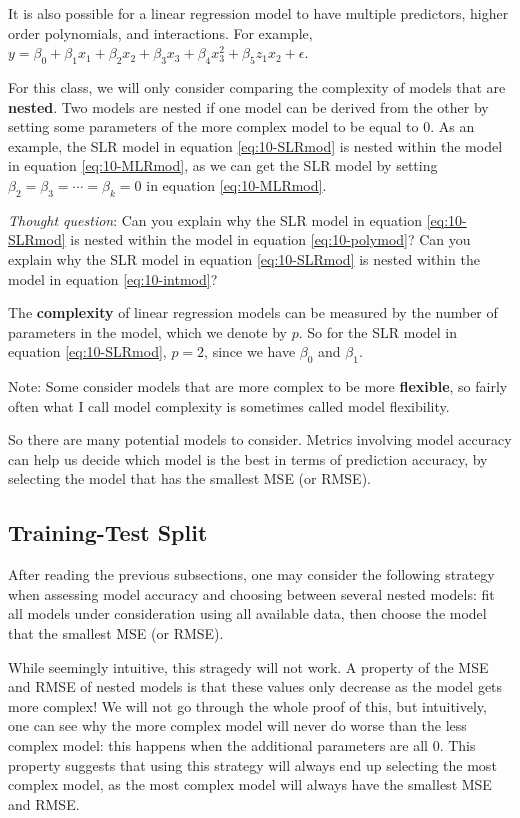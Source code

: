 \documentclass[
]{book}
\begin{document}
It is also possible for a linear regression model to have multiple predictors, higher order polynomials, and interactions. For example, \(y=\beta_0+\beta_{1}x_1 + \beta_2 x_2 + \beta_3 x_3 + \beta_4 x_3^2 + \beta_5 z_1 x_2 + \epsilon\).

For this class, we will only consider comparing the complexity of models that are \textbf{nested}. Two models are nested if one model can be derived from the other by setting some parameters of the more complex model to be equal to 0. As an example, the SLR model in equation \eqref{eq:10-SLRmod} is nested within the model in equation \eqref{eq:10-MLRmod}, as we can get the SLR model by setting \(\beta_2 = \beta_3 = \cdots = \beta_k = 0\) in equation \eqref{eq:10-MLRmod}.

\emph{Thought question}: Can you explain why the SLR model in equation \eqref{eq:10-SLRmod} is nested within the model in equation \eqref{eq:10-polymod}? Can you explain why the SLR model in equation \eqref{eq:10-SLRmod} is nested within the model in equation \eqref{eq:10-intmod}?

The \textbf{complexity} of linear regression models can be measured by the number of parameters in the model, which we denote by \(p\). So for the SLR model in equation \eqref{eq:10-SLRmod}, \(p=2\), since we have \(\beta_0\) and \(\beta_1\).

Note: Some consider models that are more complex to be more \textbf{flexible}, so fairly often what I call model complexity is sometimes called model flexibility.

So there are many potential models to consider. Metrics involving model accuracy can help us decide which model is the best in terms of prediction accuracy, by selecting the model that has the smallest MSE (or RMSE).

\hypertarget{training-test-split}{%
\subsection{Training-Test Split}\label{training-test-split}}

After reading the previous subsections, one may consider the following strategy when assessing model accuracy and choosing between several nested models: fit all models under consideration using all available data, then choose the model that the smallest MSE (or RMSE).

While seemingly intuitive, this stragedy will not work. A property of the MSE and RMSE of nested models is that these values only decrease as the model gets more complex! We will not go through the whole proof of this, but intuitively, one can see why the more complex model will never do worse than the less complex model: this happens when the additional parameters are all 0. This property suggests that using this strategy will always end up selecting the most complex model, as the most complex model will always have the smallest MSE and RMSE.
\end{document}
